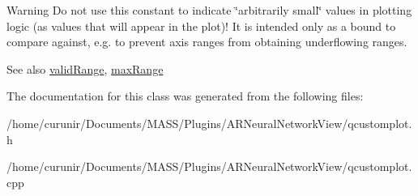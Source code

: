 \begin{DoxyWarning}{Warning}
Do not use this constant to indicate \char`\"{}arbitrarily small\char`\"{} values in plotting logic (as values that will appear in the plot)! It is intended only as a bound to compare against, e.\+g. to prevent axis ranges from obtaining underflowing ranges.
\end{DoxyWarning}
\begin{DoxySeeAlso}{See also}
\hyperlink{class_q_c_p_range_ab38bd4841c77c7bb86c9eea0f142dcc0}{valid\+Range}, \hyperlink{class_q_c_p_range_a34c2817056d5eb5c32524e34a85b4255}{max\+Range} 
\end{DoxySeeAlso}


The documentation for this class was generated from the following files\+:\begin{DoxyCompactItemize}
\item 
/home/curunir/\+Documents/\+M\+A\+S\+S/\+Plugins/\+A\+R\+Neural\+Network\+View/qcustomplot.\+h\item 
/home/curunir/\+Documents/\+M\+A\+S\+S/\+Plugins/\+A\+R\+Neural\+Network\+View/qcustomplot.\+cpp\end{DoxyCompactItemize}
